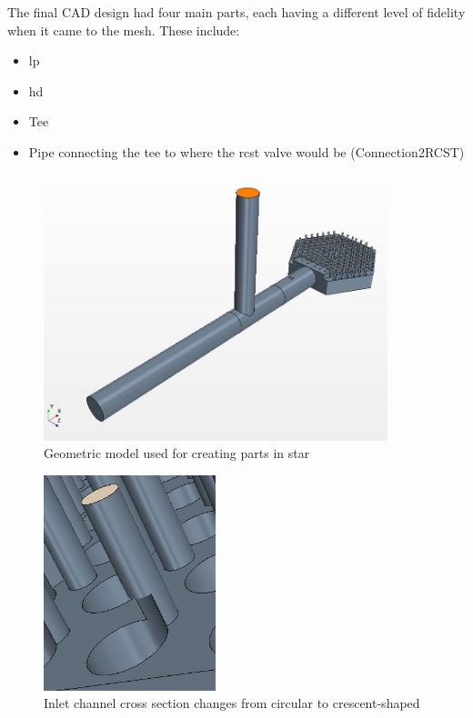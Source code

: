 \documentclass[double,12pt]{beavtex}
\begin{document}
The final CAD design had four main parts, each having a different level of fidelity when it came to the mesh. These include:

\begin{itemize}
    \item \acrshort{lp} 
    \item \acrshort{hd}
    \item Tee
    \item Pipe connecting the tee to where the \acrshort{rcst} valve would be (Connection2RCST)
\end{itemize}


\begin{figure}[!ht]
    \begin{center}
    	\includegraphics[width=10cm]{Figures/LP_Geometry.JPG}
    	\caption{Geometric model used for creating parts in \acrshort{star}}
    	\label{fig:LP_Geometry}
    	\end{center}
\end{figure}

\begin{figure}[!ht]
    \begin{center}
    	\includegraphics[width=5cm]{Figures/LP_Inlet_Crescents.JPG}
    	\caption{Inlet channel cross section changes from circular to crescent-shaped}
    	\label{fig:LP_Inlet_Crescents}
    	\end{center}
\end{figure}
\end{document}
